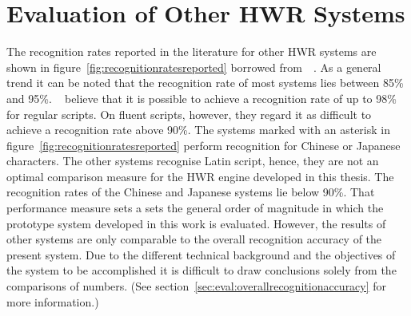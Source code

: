 


\section{Evaluation of Other HWR Systems}
\label{sec:eval:othersystems}

The recognition rates reported in the literature for other HWR systems are 
shown in figure~\ref{fig:recognitionratesreported} borrowed 
from~~\citeyear{LiuJaegerNakagawa2004}.
As a general trend it can be noted that the recognition rate of most systems
lies between 85\% and 95\%. 
~\citeyear{LiuJaegerNakagawa2004}
believe that it is possible to achieve a recognition rate of up to 98\% 
for regular scripts. On fluent scripts, however, they regard it as difficult 
to achieve a recognition rate above 90\%.
The systems marked with an asterisk in figure~\ref{fig:recognitionratesreported}
perform recognition for Chinese or Japanese characters. 
The other systems recognise Latin script, hence, they are not an optimal
comparison measure for the HWR engine developed in this thesis.
The recognition rates of the Chinese and Japanese systems lie below 90\%. 
That performance measure sets a sets the general order of magnitude in which 
the prototype system developed in this work is evaluated.
However, the results of other systems are only comparable to the overall 
recognition accuracy of the present system. Due to the different technical
background and the objectives of the system to be accomplished
it is difficult to draw conclusions solely from the comparisons of numbers. 
(See section~\ref{sec:eval:overallrecognitionaccuracy} for more information.)
